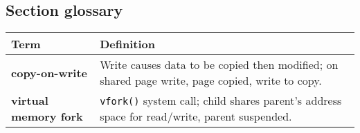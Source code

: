 \subsection*{Section glossary}
\begin{tabular}{p{}p{}}
    \toprule
    \textbf{Term} & \textbf{Definition} \\
    \midrule
    \textbf{copy-on-write} & Write causes data to be copied then modified; on shared page write, page copied, write to copy. \\
    \textbf{virtual memory fork} & \texttt{vfork()} system call; child shares parent's address space for read/write, parent suspended. \\
    \bottomrule
\end{tabular}
